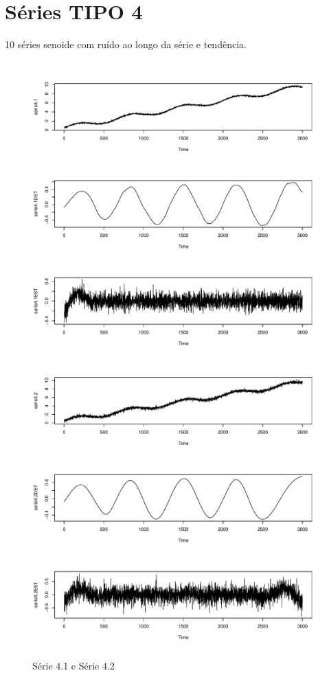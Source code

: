 \section{Séries TIPO 4}
10 séries senoide com ruído ao longo da série e tendência.
\graphicspath{{imagens/}}
\begin{figure}[H]
\begin{center}
  \includegraphics[scale=0.43]{serie4_1.pdf} \quad
  \includegraphics[scale=0.43]{serie4_2.pdf}
  \caption{Série 4.1 e Série 4.2}
\end{center}
\end{figure}

